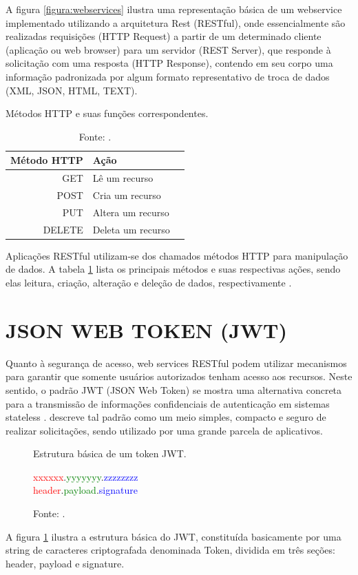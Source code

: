 \pagebreak
A figura \ref{figura:webservices} ilustra uma representação básica de um webservice implementado utilizando a arquitetura Rest (RESTful), onde essencialmente são realizadas requisições (HTTP Request) a partir de um determinado cliente (aplicação ou web browser) para um servidor (REST Server), que responde à solicitação com uma resposta (HTTP Response), contendo em seu corpo uma informação padronizada por algum formato representativo de troca de dados (XML, JSON, HTML, TEXT).

\begin{table}[h]
	\captionsetup{justification=centering}
	\centering
	\caption{Métodos HTTP e suas funções correspondentes.}
	\caption*{Fonte: .}
	\label{tabela:metodoshttp}
	\begin{tabular}{r|lr}
		Método HTTP &  Ação\\
		\hline
		GET & Lê um recurso  \\
		POST & Cria um recurso  \\
		PUT & Altera um recurso \\
		DELETE & Deleta um recurso 
	\end{tabular}
\end{table}

Aplicações RESTful utilizam-se dos chamados métodos HTTP para manipulação de dados. A tabela \ref{tabela:metodoshttp} lista os principais métodos e suas respectivas ações, sendo elas leitura, criação, alteração e deleção de dados, respectivamente \cite{pautasso2008restful}.

\section{JSON WEB TOKEN (JWT)}

Quanto à segurança de acesso, web services RESTful podem utilizar mecanismos para garantir que somente usuários autorizados tenham acesso aos recursos. Neste sentido, o padrão JWT (JSON Web Token) \cite{jwt} se mostra uma alternativa concreta para a transmissão de informações confidenciais de autenticação em sistemas stateless \cite{jones2015json}.  descreve tal padrão como um meio simples, compacto e seguro de realizar solicitações, sendo utilizado por uma grande parcela de aplicativos.

\begin{figure}[h]
	\caption{Estrutura básica de um token JWT.}
	\caption*{Fonte: .}
	\label{figura:jwt}
	\begin{center}
		\textcolor{red}{xxxxxx}.\textcolor{green}{yyyyyyy}.\textcolor{blue}{zzzzzzzz}\\
		\textcolor{red}{header}.\textcolor{green}{payload}.\textcolor{blue}{signature}\\
	\end{center}
\end{figure}

A figura \ref{figura:jwt} ilustra a estrutura básica do JWT, constituída basicamente por uma string de caracteres criptografada denominada Token, dividida em três seções: header, payload e signature.